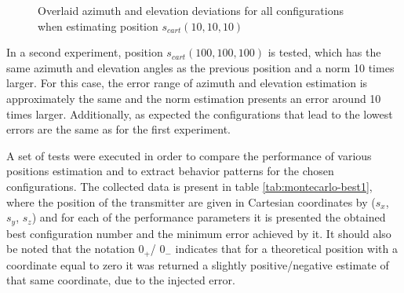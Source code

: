 \begin{figure}[!htbp]
	\captionsetup{justification=centering,margin=2cm}
	\caption{Overlaid azimuth and elevation deviations for all configurations when estimating position $s_{cart}(10,10,10)$}
	\label{fig:both-101010}
\end{figure}

In a second experiment, position $s_{cart}(100,100,100)$ is tested, which has the same azimuth and elevation angles as the previous position and a norm 10 times larger. For this case, the error range of azimuth and elevation estimation is approximately the same and the norm estimation presents an error around 10 times larger. Additionally, as expected the configurations that lead to the lowest errors are the same as for the first experiment.

A set of tests were executed in order to compare the performance of various positions estimation and to extract behavior patterns for the chosen configurations. The collected data is present in table \ref{tab:montecarlo-best1}, where the position of the transmitter are given in Cartesian coordinates by ($s_x$, $s_y$, $s_z$) and for each of the performance parameters it is presented the obtained best configuration number and the minimum error achieved by it. It should also be noted that the notation $0_{+}$/ $0_{-}$ indicates that for a theoretical position with a coordinate equal to zero it was returned a slightly positive/negative estimate of that same coordinate, due to the injected error.

